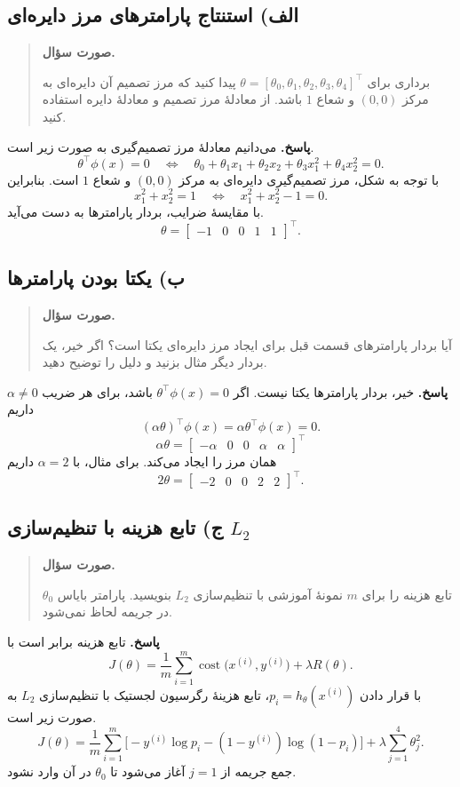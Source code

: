 \documentclass{article}
\numberwithin{equation}{section}
\numberwithin{table}{section}
\newenvironment{questionprompt}{%
    \begin{quote}\noindent\textbf{صورت سؤال.}\enspace\ignorespaces
}{%
    \end{quote}\noindent\textbf{پاسخ.}\enspace\ignorespacesafterend
}
\begin{document}
\subsection*{الف) استنتاج پارامترهای مرز دایره‌ای}
\begin{questionprompt}
    برداری برای \(\theta=[\theta_0,\theta_1,\theta_2,\theta_3,\theta_4]^\top\) پیدا کنید که مرز تصمیم آن دایره‌ای به مرکز \((0,0)\) و شعاع \(1\) باشد. از معادلهٔ مرز تصمیم و معادلهٔ دایره استفاده کنید.
\end{questionprompt}
می‌دانیم معادلهٔ مرز تصمیم‌گیری به صورت زیر است.
\[
    \theta^\top\phi(x)=0
    \quad\Longleftrightarrow\quad
    \theta_0+\theta_1x_1+\theta_2x_2+\theta_3x_1^2+\theta_4x_2^2=0.
\]
با توجه به شکل، مرز تصمیم‌گیری دایره‌ای به مرکز \((0,0)\) و شعاع \(1\) است. بنابراین
\[
    x_1^2+x_2^2=1
    \quad\Longleftrightarrow\quad
    x_1^2+x_2^2-1=0.
\]
با مقایسهٔ ضرایب، بردار پارامترها به دست می‌آید.
\[
    \theta=\begin{bmatrix}-1&0&0&1&1\end{bmatrix}^{\top}.
\]

\subsection*{ب) یکتا بودن پارامترها}
\begin{questionprompt}
    آیا بردار پارامترهای قسمت قبل برای ایجاد مرز دایره‌ای یکتا است؟ اگر خیر، یک بردار دیگر مثال بزنید و دلیل را توضیح دهید.
\end{questionprompt}
خیر، بردار پارامترها یکتا نیست. اگر \(\theta^\top\phi(x)=0\) باشد، برای هر ضریب \(\alpha\neq0\) داریم
\[
    (\alpha\theta)^\top\phi(x)
      =\alpha\theta^\top\phi(x)=0.
\]
\[
    \alpha\theta
      =\begin{bmatrix}-\alpha&0&0&\alpha&\alpha\end{bmatrix}^{\top}
\]
همان مرز را ایجاد می‌کند. برای مثال، با \(\alpha=2\) داریم
\[
    2\theta=\begin{bmatrix}-2&0&0&2&2\end{bmatrix}^{\top}.
\]

\subsection*{ج) تابع هزینه با تنظیم‌سازی \(L_2\)}
\begin{questionprompt}
    تابع هزینه را برای \(m\) نمونهٔ آموزشی با تنظیم‌سازی \(L_2\) بنویسید. پارامتر بایاس \(\theta_0\) در جریمه لحاظ نمی‌شود.
\end{questionprompt}
تابع هزینه برابر است با
\[
    J(\theta)=\frac1m\sum_{i=1}^{m}
      \operatorname{cost}\bigl(x^{(i)},y^{(i)}\bigr)+\lambda R(\theta).
\]
با قرار دادن \(p_i=h_\theta(x^{(i)})\)، تابع هزینهٔ رگرسیون لجستیک با تنظیم‌سازی \(L_2\) به صورت زیر است.
\[
    J(\theta)
      =\frac1m\sum_{i=1}^{m}
        \bigl[-y^{(i)}\log p_i-(1-y^{(i)})\log(1-p_i)\bigr]
        +\lambda\sum_{j=1}^{4}\theta_j^2.
\]
جمع جریمه از \(j=1\) آغاز می‌شود تا \(\theta_0\) در آن وارد نشود.
\end{document}
